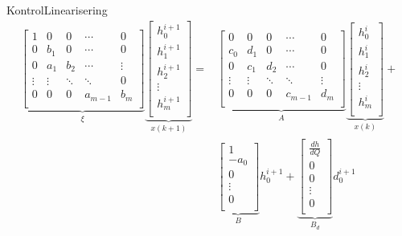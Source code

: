 \begin{frame}{Kontrol}{Linearisering}
 \begin{equation}
\begin{aligned}
	   \underbrace{\begin{bmatrix}
	    	1 & 0    & 0    &\cdots &0\\
	    	0 & b_1  & 0    &\cdots &0\\
	    	0 &a_{1} & b_2  &\cdots &\vdots	  \\
	    \vdots&\vdots&\ddots&\ddots & 0  \\
	        0 & 0    &0  	&a_{m-1}&  b_m\\
	   \end{bmatrix}}_{\xi}
	    \underbrace{\begin{bmatrix}
		h_{0}^{i+1}\\
		h_{1}^{i+1} \\
		h_{2}^{i+1} \\			
		\vdots		\\
		h_{m}^{i+1}\\
	\end{bmatrix}}_{x(k+1)}
	=& 
	\underbrace{\begin{bmatrix}
	    	0 &  0   &   0    & \cdots   &0\\
	    c_{0} & d_1  &   0    &  \cdots  &0\\
	    0	  &c_{1} & d_2    & \cdots   &0 \\
	    \vdots&\vdots&\ddots  & \ddots   & \vdots\\
	    0	  & 0    &  0     &  c_{m-1} &  d_m\\
	    \end{bmatrix}}_{A}
	    	\underbrace{\begin{bmatrix}
		h_{0}^{i} \\
		h_{1}^{i} \\
		h_{2}^{i}\\
		\vdots		\\
		h_{m}^{i}\\
		\end{bmatrix}}_{x(k)}
	+ \\ & \underbrace{\begin{bmatrix}
		 1\\
		 -a_0 \\
		 0\\
		 \vdots \\
		 0\\
		\end{bmatrix}}_{B}
		h_0^{i+1}
		+ 
		\underbrace{\begin{bmatrix}
		 \frac{dh}{dQ}\\
		 0 \\
		 0\\
		 \vdots \\
		 0\\
		\end{bmatrix}}_{B_d}
		d_{0}^{i+1}
	\end{aligned}
\end{equation}   



\end{frame}
